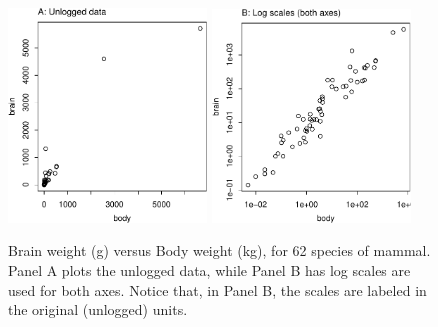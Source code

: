 \documentclass[12pt, a4paper,  BCOR=8.25mm, DIV=15]{scrartcl}\usepackage[]{graphicx}\usepackage[]{color}
\newenvironment{knitrout}{}{} %
\begin{document}
\begin{figure}
\begin{knitrout}
\color{fgcolor}

{\centering \includegraphics[width=0.47\textwidth]{figs/glm-fig5_1e-1} 
\includegraphics[width=0.47\textwidth]{figs/glm-fig5_1e-2} 

}



\end{knitrout}
\caption{Brain weight (g) versus Body weight (kg), for 62 species of mammal.
Panel A plots the unlogged data, while Panel B has log scales are used for
both axes. Notice that, in Panel B, the scales are
  labeled in the original (unlogged) units.
  \label{fig:Animals}}
\end{figure}
\end{document}
